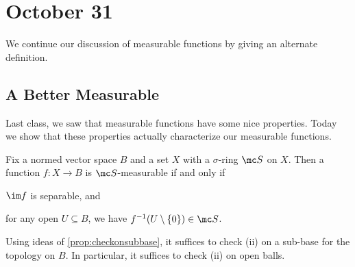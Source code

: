 \documentclass[../notes.tex]{subfiles}
\begin{document}
\section{October 31}

We continue our discussion of measurable functions by giving an alternate definition.

\subsection{A Better Measurable}
Last class, we saw that measurable functions have some nice properties. Today we show that these properties actually characterize our measurable functions.
\begin{theorem} \label{thm:better-measurable}
	Fix a normed vector space $B$ and a set $X$ with a $\sigma$-ring $\mc S$ on $X$. Then a function $f\colon X\to B$ is $\mc S$-measurable if and only if
	\begin{listroman}
		\item $\im f$ is separable, and
		\item for any open $U\subseteq B$, we have $f^{-1}(U\setminus\{0\})\in\mc S$.
	\end{listroman}
\end{theorem}
\begin{remark}
	Using ideas of \autoref{prop:checkonsubbase}, it suffices to check (ii) on a sub-base for the topology on $B$. In particular, it suffices to check (ii) on open balls.
\end{remark}
\end{document}
